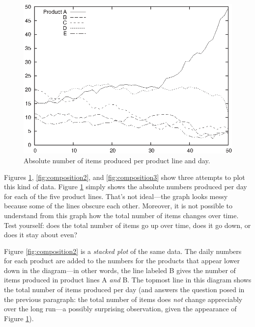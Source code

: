 \begin{figure}
  \centerline{\includegraphics{img/composition1}}
  \caption{Absolute number of items produced per product line and day.}
  \label{fig:composition1}
\end{figure}

Figures \ref{fig:composition1}, \ref{fig:composition2}, and
\ref{fig:composition3} show three attempts to plot this kind of data.
Figure \ref{fig:composition1} simply shows the absolute numbers
produced per day for each of the five product lines. That's not
ideal---the graph looks messy because some of the lines obscure each
other.  Moreover, it is not possible to understand from this graph how
the total number of items changes over time. Test yourself: does the
total number of items go up over time, does it go down, or does it
stay about even?

Figure \ref{fig:composition2} is a \emph{stacked plot}  of the same
data. The daily numbers for each product are added to the numbers for
the products that appear lower down in the diagram---in other words,
the line labeled B gives the number of items produced in product lines
A \emph{and} B. The topmost line in this diagram shows the total
number of items produced per day (and answers the question posed in
the previous paragraph: the total number of items does \emph{not}
change appreciably over the long run---a possibly surprising
observation, given the appearance of Figure \ref{fig:composition1}).

